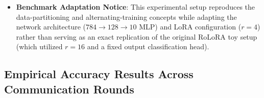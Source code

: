 \documentclass[10pt,a4paper]{article}
\begin{document}
\begin{itemize}
\begin{itemize}
        \item \textbf{FDA EMA-Standard (\texttt{NEW2FDA})}: Adaptive epoch schedule with Exponential Moving Average ($\rho=0.9$) smoothed variance.
        \item \textbf{FDA SMA (\texttt{NEW3FDA})}: Adaptive epoch schedule with Simple Moving Average ($W=3$ rounds) smoothed variance.
    \end{itemize}
    \item \textbf{Benchmark Adaptation Notice}: This experimental setup reproduces the data-partitioning and alternating-training concepts while adapting the network architecture ($784 \to 128 \to 10$ MLP) and LoRA configuration ($r=4$) rather than serving as an exact replication of the original RoLoRA toy setup (which utilized $r=16$ and a fixed output classification head).
\end{itemize}

\subsection{Empirical Accuracy Results Across Communication Rounds}
\end{document}
